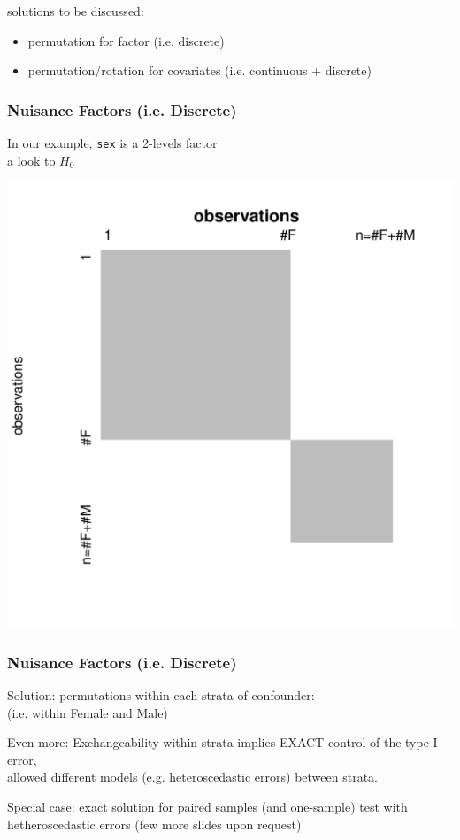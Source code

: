 \documentclass[xcolor={pdftex,dvipsnames,table}]{beamer}
\newcommand{\bb}[1]{\begin{block}{#1}}
\newcommand{\eb}{\end{block}}
\newcommand{\bi}{\begin {itemize}}
\newcommand{\ei}{\end{itemize}}
\begin{document}
\begin{frame}[fragile]

\bb{solutions to be discussed:}
\bi
\item permutation for factor (i.e. discrete)
\item permutation/rotation for covariates (i.e. continuous + discrete)
\ei
\eb


\end{frame}

\begin{frame}[fragile]
\frametitle{Nuisance Factors (i.e. Discrete)}
In our example, {\tt sex} is a 2-levels factor\\

\pause
\textcolor{myblue}{a look to $H_0$}

\includegraphics[scale=.35]{figures_perm_covariates/Pind2sample}

\end{frame}

\begin{frame}[fragile]
\frametitle{Nuisance Factors (i.e. Discrete)}
\bb{Solution:} permutations within each strata of confounder:\\
(i.e. within Female and Male)
\eb
\pause
\bb{Even more:} Exchangeability within strata implies \textcolor{redUnipd}{EXACT control of the type I error}, \\ 
 allowed different models (e.g. heteroscedastic errors) between strata.
\eb
\pause
\bb{Special case:} exact solution for paired samples (and one-sample) test with hetheroscedastic errors (few more slides upon request)
\eb
\end{frame}
\end{document}
